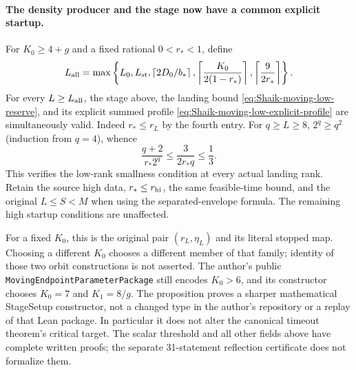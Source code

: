 \paragraph{The density producer and the stage now have a common explicit startup.}
For \(K_0\ge4+g\) and a fixed rational \(0<r_*<1\), define
\begin{equation}\label{eq:Shaik-common-moving-startup}
 L_{\rm all}=\max\left\{L_0,L_{\rm st},
 \left\lceil2D_0/b_*\right\rceil,
 \left\lceil\frac{K_0}{2(1-r_*)}\right\rceil,
 \left\lceil\frac9{2r_*}\right\rceil\right\}.
\end{equation}
For every \(L\ge L_{\rm all}\), the stage above, the landing bound
\eqref{eq:Shaik-moving-low-reserve}, and its explicit summed profile
\eqref{eq:Shaik-moving-low-explicit-profile} are simultaneously valid.
Indeed \(r_*\le r_L\) by the fourth entry. For \(q\ge L\ge8\),
\(2^q\ge q^2\) (induction from \(q=4\)), whence
\[
 \frac{q+2}{r_*2^q}
 \le\frac{3}{2r_*q}\le\frac13.
\]
This verifies the low-rank smallness condition at every actual
landing rank. Retain the source high data, \(r_*\le r_{\rm hi}\),
the same feasible-time bound, and the original \(L\le S<M\)
when using the separated-envelope formula. The remaining high
startup conditions are unaffected.

For a fixed \(K_0\), this is the original pair \((r_L,\eta_L)\)
and its literal stopped map. Choosing a different \(K_0\) chooses
a different member of that family; identity of those two orbit
constructions is not asserted. The author's public
\texttt{MovingEndpointParameterPackage} still encodes
\(K_0>6\), and its constructor chooses \(K_0=7\) and \(K_1=8/g\).
The proposition proves a sharper mathematical StageSetup constructor,
not a changed type in the author's repository or a replay of that
Lean package. In particular it does not alter the canonical
timeout theorem's critical target. The scalar threshold and all
other fields above have complete written proofs; the separate
31-statement reflection certificate does not formalize them.

